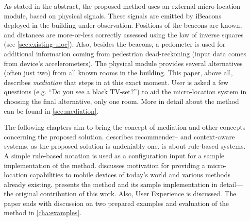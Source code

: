 As stated in the abstract, the proposed method uses an external micro-location module, based on physical signals. These signals are emitted by iBeacons deployed in the building under observation. Positions of the beacons are known, and distances are more-or-less correctly assessed using the law of inverse squares (see \cref{sec:existing-uloc}). Also, besides the beacons, a pedometer is used for additional information coming from pedestrian dead-reckoning (input data comes from device's accelerometers). The physical module provides several alternatives (often just two) from all known rooms in the building. This paper, above all, describes \emph{mediation} that steps in at this exact moment. User is asked a few questions (e.g. ``Do you see a black TV-set?'') to aid the micro-location system in choosing the final alternative, only one room. More in detail about the method can be found in \cref{sec:mediation}.


The following chapters aim to bring the concept of mediation and other concepts concerning the proposed solution.  describes recommender-- and context-aware systems, as the proposed solution is undeniably one.  is about rule-based systems. A simple rule-based notation is used as a configuration input for a sample implementation of the method.  discusses motivation for providing a micro-location capabilities to mobile devices of today's world and various methods already existing.  presents the method and its sample implementation in detail---the original contribution of this work. Also, User Experience is discussed. The paper ends with discussion on two prepared examples and evaluation of the method in \cref{cha:examples}. %
